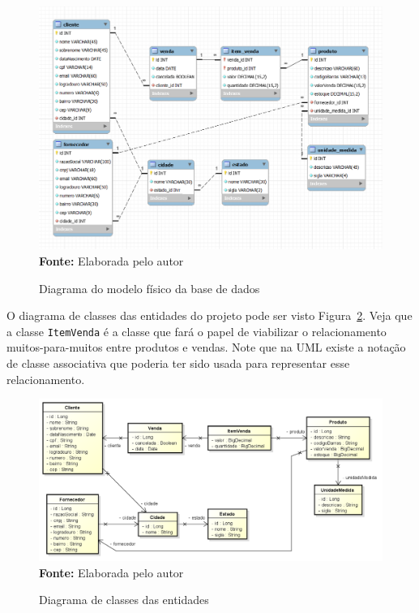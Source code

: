 \FloatBarrier
\begin{figure}[!htbp]
    \centering
    \caption{Diagrama do modelo físico da base de dados}
    \includegraphics[scale=0.5]{imagens/cap08ModeloFisico}
    \\\textbf{Fonte:} Elaborada pelo autor
    \label{fig:cap08ModeloFisico}
\end{figure}
\FloatBarrier

O diagrama de classes das entidades do projeto pode ser visto Figura~\ref{fig:cap08DiagramaClasses}. Veja que a classe \texttt{ItemVenda} é a classe que fará o papel de viabilizar o relacionamento muitos-para-muitos entre produtos e vendas. Note que na UML existe a notação de classe associativa que poderia ter sido usada para representar esse relacionamento.

\FloatBarrier
\begin{figure}[!htbp]
    \centering
    \caption{Diagrama de classes das entidades}
    \includegraphics[scale=0.45]{imagens/cap08DiagramaClasses}
    \\\textbf{Fonte:} Elaborada pelo autor
    \label{fig:cap08DiagramaClasses}
\end{figure}
\FloatBarrier

